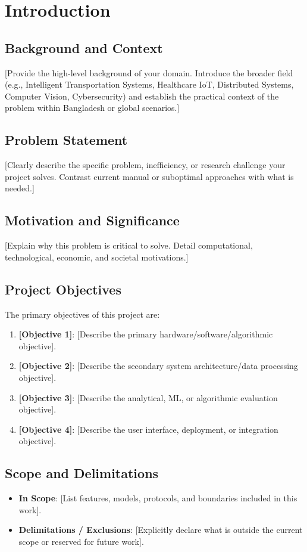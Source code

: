 \cleardoublepage
{}
\setcounter{page}{1}

\chapter{Introduction}

\section{Background and Context}
[Provide the high-level background of your domain. Introduce the broader field (e.g., Intelligent Transportation Systems, Healthcare IoT, Distributed Systems, Computer Vision, Cybersecurity) and establish the practical context of the problem within Bangladesh or global scenarios.]

\section{Problem Statement}
[Clearly describe the specific problem, inefficiency, or research challenge your project solves. Contrast current manual or suboptimal approaches with what is needed.]

\section{Motivation and Significance}
[Explain why this problem is critical to solve. Detail computational, technological, economic, and societal motivations.]

\section{Project Objectives}
The primary objectives of this project are:
\begin{enumerate}
    \item \textbf{[Objective 1]}: [Describe the primary hardware/software/algorithmic objective].
    \item \textbf{[Objective 2]}: [Describe the secondary system architecture/data processing objective].
    \item \textbf{[Objective 3]}: [Describe the analytical, ML, or algorithmic evaluation objective].
    \item \textbf{[Objective 4]}: [Describe the user interface, deployment, or integration objective].
\end{enumerate}

\section{Scope and Delimitations}
\begin{itemize}
    \item \textbf{In Scope}: [List features, models, protocols, and boundaries included in this work].
    \item \textbf{Delimitations / Exclusions}: [Explicitly declare what is outside the current scope or reserved for future work].
\end{itemize}

